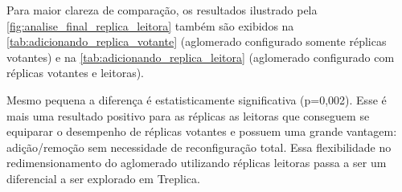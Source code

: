 Para maior clareza de comparação, os resultados ilustrado pela
\autoref{fig:analise_final_replica_leitora} também são exibidos na
\autoref{tab:adicionando_replica_votante} (aglomerado configurado somente réplicas
votantes) e na \autoref{tab:adicionando_replica_leitora} (aglomerado configurado com
réplicas votantes e leitoras).

\begin{table}[htb]
\end{table}

\begin{table}[htb]
\end{table}

Mesmo pequena a diferença é estatisticamente significativa (p=0,002). Esse é mais uma
resultado positivo para as réplicas as leitoras que conseguem se equiparar o desempenho de
réplicas votantes e possuem uma grande vantagem: adição/remoção sem necessidade de
reconfiguração total. Essa flexibilidade no redimensionamento do aglomerado utilizando
réplicas leitoras passa a ser um diferencial a ser explorado em Treplica.

